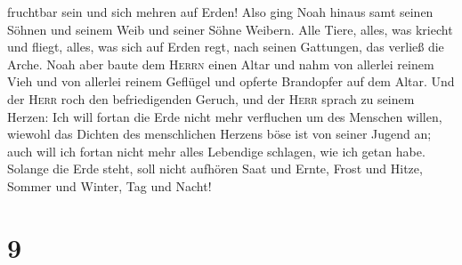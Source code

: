 fruchtbar sein und sich mehren auf Erden!  Also ging Noah
hinaus samt seinen Söhnen und seinem Weib und seiner Söhne Weibern.
 Alle Tiere, alles, was kriecht und fliegt, alles, was
sich auf Erden regt, nach seinen Gattungen, das verließ die Arche.
 Noah aber baute dem \textsc{Herrn} einen Altar und nahm
von allerlei reinem Vieh und von allerlei reinem Geflügel und opferte
Brandopfer auf dem Altar.  Und der \textsc{Herr} roch den
befriedigenden Geruch, und der \textsc{Herr} sprach zu seinem Herzen:
Ich will fortan die Erde nicht mehr verfluchen um des Menschen willen,
wiewohl das Dichten des menschlichen Herzens böse ist von seiner Jugend
an; auch will ich fortan nicht mehr alles Lebendige schlagen, wie ich
getan habe.  Solange die Erde steht, soll nicht aufhören
Saat und Ernte, Frost und Hitze, Sommer und Winter, Tag und Nacht!

\hypertarget{section-8}{%
\section{9}\label{section-8}}

